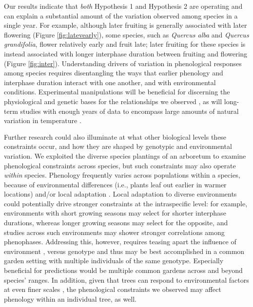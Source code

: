 \documentclass{article}
\begin{document}
\par Our results indicate that \textit{both} Hypothesis 1 and Hypothesis 2 are operating and can explain a substantial amount of the variation observed among species in a single year. For example, although later fruiting is generally associated with later flowering (Figure \ref{fig:latevearly}), some species, such as \textit{Quercus alba} and \textit{Quercus grandifolia}, flower relatively early and fruit late; later fruiting for these species is instead associated with longer interphase duration between fruiting and flowering (Figure \ref{fig:inter}). Understanding drivers of variation in phenological responses among species requires disentangling the ways that earlier phenology and interphase duration interact with one another, and with environmental conditions. Experimental manipulations will be beneficial for discerning the physiological and genetic bases for the relationships we observed \citep{flint1974}, as will long-term studies with enough years of data to encompass large amounts of natural variation in temperature \citep[e.g.,][]{inouye2008}.

\par Further research could also illuminate at what other biological levels these constraints occur, and how they are shaped by genotypic and environmental variation. We exploited the diverse species plantings of an arboretum to examine phenological constraints across species, but such constraints may also operate \emph{within} species. Phenology frequently varies across populations within a species, because of environmental differences (i.e., plants leaf out earlier in warmer locations) and/or local adaptation \citep{rathcke1985}. Local adaptation to diverse environments could potentially drive stronger constraints at the intraspecific level: for example, environments with short growing seasons may select for shorter interphase durations, whereas longer growing seasons may select for the opposite, and studies across such environments may shower stronger correlations among phenophases. Addressing this, however, requires teasing apart the influence of environment \citep[even to the microclimatic level, see][]{schwartz2014}, versus genotype and thus may be best accomplished in a common garden setting with multiple individuals of the same genotype. Especially beneficial for predictions would be multiple common gardens across and beyond species' ranges. In addition, given that trees can respond to environmental factors at even finer scales \citep[e.g., the branch level,][]{nakamura2010}, the phenological constraints we observed may affect phenology within an individual tree, as well. 
\end{document}
